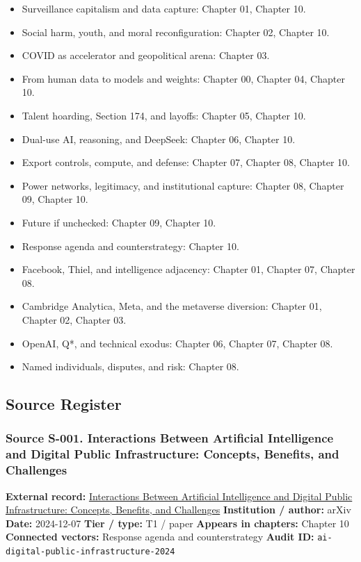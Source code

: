 \documentclass[
  american,
  11pt,
  letterpaper,
]{article}
\providecommand{\tightlist}{%
  \setlength{\itemsep}{0pt}\setlength{\parskip}{0pt}}
\begin{document}
\begin{itemize}
\tightlist
\item
  Surveillance capitalism and data capture: Chapter 01, Chapter 10.
\item
  Social harm, youth, and moral reconfiguration: Chapter 02, Chapter 10.
\item
  COVID as accelerator and geopolitical arena: Chapter 03.
\item
  From human data to models and weights: Chapter 00, Chapter 04, Chapter
  10.
\item
  Talent hoarding, Section 174, and layoffs: Chapter 05, Chapter 10.
\item
  Dual-use AI, reasoning, and DeepSeek: Chapter 06, Chapter 10.
\item
  Export controls, compute, and defense: Chapter 07, Chapter 08, Chapter
  10.
\item
  Power networks, legitimacy, and institutional capture: Chapter 08,
  Chapter 09, Chapter 10.
\item
  Future if unchecked: Chapter 09, Chapter 10.
\item
  Response agenda and counterstrategy: Chapter 10.
\item
  Facebook, Thiel, and intelligence adjacency: Chapter 01, Chapter 07,
  Chapter 08.
\item
  Cambridge Analytica, Meta, and the metaverse diversion: Chapter 01,
  Chapter 02, Chapter 03.
\item
  OpenAI, Q*, and technical exodus: Chapter 06, Chapter 07, Chapter 08.
\item
  Named individuals, disputes, and risk: Chapter 08.
\end{itemize}

\subsection{Source Register}\label{source-register}

\subsubsection{Source S-001. Interactions Between Artificial
Intelligence and Digital Public Infrastructure: Concepts, Benefits, and
Challenges}\label{source-s-001-interactions-between-artificial-intelligence-and-digital-public-infrastructure-concepts-benefits-and-challenges}

\textbf{External record:}
\href{https://arxiv.org/abs/2412.05761}{Interactions Between Artificial
Intelligence and Digital Public Infrastructure: Concepts, Benefits, and
Challenges} \textbf{Institution / author:} arXiv \textbf{Date:}
2024-12-07 \textbf{Tier / type:} T1 / paper \textbf{Appears in
chapters:} Chapter 10 \textbf{Connected vectors:} Response agenda and
counterstrategy \textbf{Audit ID:}
\texttt{ai-digital-public-infrastructure-2024}
\end{document}
